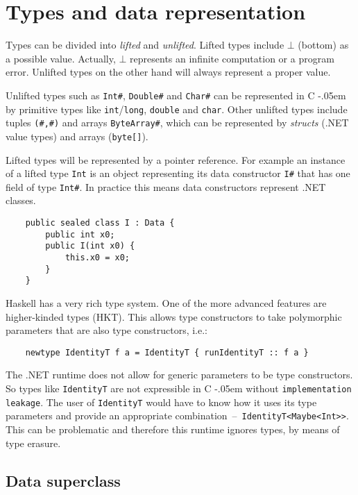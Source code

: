 \documentclass[en]{pracamgr}
\newcommand{\shrp}{%
  {\settoheight{\dimen0}{C}\kern-.05em \resizebox{!}{\dimen0}{\raisebox{\depth}{\textbf{\#}}}\hspace{1ex}}}
\begin{document}
\section{Types and data representation}

Types can be divided into \textit{lifted} and \textit{unlifted}.
Lifted types include $\bot$ (bottom) as a possible value.
Actually, $\bot$ represents an infinite computation or
a program error. Unlifted types on the other hand will
always represent a proper value.

Unlifted types such as \texttt{Int\#}, \texttt{Double\#}
and \texttt{Char\#} can be represented in C\shrp by
primitive types like \texttt{int}/\texttt{long}, \texttt{double} and \texttt{char}.
Other unlifted types include tuples \texttt{(\#,\#)} and
arrays \texttt{ByteArray\#}, which can be represented by
\textit{structs} (.NET value types) and arrays (\texttt{byte[]}).

Lifted types will be represented by a pointer reference.
For example an instance of a lifted type \texttt{Int} is an object representing
its data constructor \texttt{I\#} that has one field of type \texttt{Int\#}.
In practice this means data constructors represent .NET classes.

\begin{verbatim}
    public sealed class I : Data {
        public int x0;
        public I(int x0) {
            this.x0 = x0;
        }
    }
\end{verbatim}

Haskell has a very rich type system.
One of the more advanced features are higher-kinded types (HKT).
This allows type constructors to take polymorphic parameters
that are also type constructors, i.e.:

\begin{verbatim}
    newtype IdentityT f a = IdentityT { runIdentityT :: f a }
\end{verbatim}

The .NET runtime does not allow for generic parameters to be
type constructors. So types like \texttt{IdentityT} are not
expressible in C\shrp without \texttt{implementation leakage}.
The user of \texttt{IdentityT} would have to know how it
uses its type parameters and provide an appropriate
combination~--~\verb|IdentityT<Maybe<Int>>|. This can be
problematic and therefore this runtime ignores types, by
means of type erasure.

\subsection{Data superclass}
\end{document}
